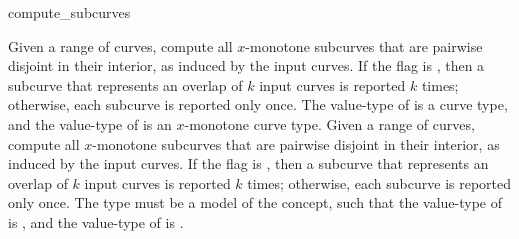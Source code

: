 \ccRefPageBegin

\begin{ccRefFunction}{compute_subcurves}


{Given a range of curves, compute all $x$-monotone subcurves that are pairwise
 disjoint in their interior, as induced by the input curves.
 If the flag  is , then a subcurve that
 represents an overlap of $k$ input curves is reported $k$ times; otherwise,
 each subcurve is reported only once. The value-type of
  is a curve type, and the value-type of
  is an $x$-monotone curve type.}
\ccGlue
{}
{Given a range of curves, compute all $x$-monotone subcurves that are pairwise
 disjoint in their interior, as induced by the input curves.
 If the flag  is , then a subcurve that
 represents an overlap of $k$ input curves is reported $k$ times; otherwise,
 each subcurve is reported only once. The  type must be a model
 of the  concept, such that the value-type of
  is , and the value-type of
  is .}
 
\end{ccRefFunction}

\ccRefPageEnd


